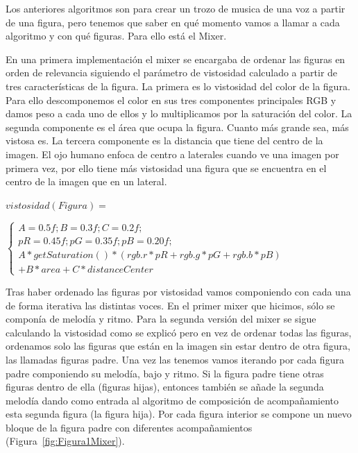 Los anteriores algoritmos son para crear un trozo de musica de una voz a partir de una figura, pero tenemos que saber en qué momento vamos a llamar a cada algoritmo y con qué figuras. Para ello está el Mixer.

En una primera implementación el mixer se encargaba de ordenar las figuras en orden de relevancia siguiendo el parámetro de vistosidad calculado a partir de tres características de la figura.
La primera es lo vistosidad del color de la figura. Para ello descomponemos el color en sus tres componentes principales RGB y damos peso a cada uno de ellos y lo multiplicamos por la saturación del color.
La segunda componente es el área que ocupa la figura. Cuanto más grande sea, más vistosa es.
La tercera componente es la distancia que tiene del centro de la imagen. El ojo humano enfoca de centro a laterales cuando ve una imagen por primera vez, por ello tiene más vistosidad una figura que se encuentra en el centro de la imagen que en un lateral.

	\begin{center}
		$vistosidad(Figura) =$
	\end{center}
	\begin{center}
		
		$\left\{
		\begin{array}{cc}
		A = 0.5f; B = 0.3f; C = 0.2f;\\ 
		pR = 0.45f; pG = 0.35f; pB = 0.20f;\\
		A*getSaturation()*(rgb.r*pR + rgb.g*pG + rgb.b*pB)\\
		 + B*area + C*distanceCenter
		\end{array}\right.$
	\end{center}

Tras haber ordenado las figuras por vistosidad vamos componiendo con cada una de forma iterativa las distintas voces. En el primer mixer que hicimos, sólo se componía  de melodía y ritmo. Para la segunda versión del mixer se sigue calculando la vistosidad como se explicó pero en vez de ordenar todas las figuras, ordenamos solo las figuras que están en la imagen sin estar dentro de otra figura, las llamadas figuras padre. Una vez las tenemos vamos iterando por cada figura padre componiendo su melodía, bajo y ritmo. Si la figura padre tiene otras figuras dentro de ella (figuras hijas), entonces también se añade la segunda melodía dando como entrada al algoritmo de composición de acompañamiento esta segunda figura (la figura hija). Por cada figura interior se compone un nuevo bloque de la figura padre con diferentes acompañamientos (Figura~\ref{fig:Figura1Mixer}).

